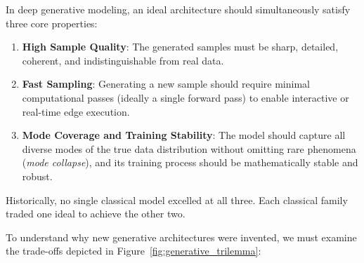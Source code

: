 \begin{keyidea}
In deep generative modeling, an ideal architecture should simultaneously satisfy three core properties:
\begin{enumerate}
    \item \textbf{High Sample Quality}: The generated samples must be sharp, detailed, coherent, and indistinguishable from real data.
    \item \textbf{Fast Sampling}: Generating a new sample should require minimal computational passes (ideally a single forward pass) to enable interactive or real-time edge execution.
    \item \textbf{Mode Coverage and Training Stability}: The model should capture all diverse modes of the true data distribution without omitting rare phenomena (\emph{mode collapse}), and its training process should be mathematically stable and robust.
\end{enumerate}
Historically, no single classical model excelled at all three. Each classical family traded one ideal to achieve the other two.
\end{keyidea}

To understand why new generative architectures were invented, we must examine the trade-offs depicted in Figure~\ref{fig:generative_trilemma}:


